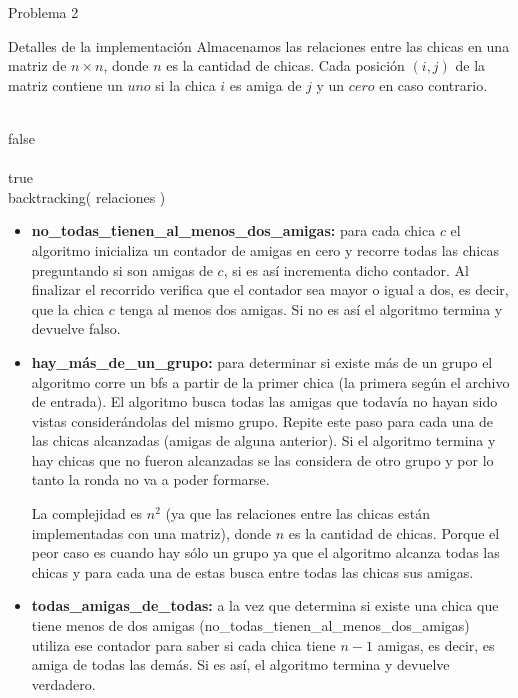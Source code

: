 \begin{section}{Problema 2}
\begin{subsection}{Detalles de la implementación}
		Almacenamos las relaciones entre las chicas en una matriz de $n \times n$, donde $n$ es la cantidad de chicas. Cada posición $(i,j)$ de la matriz contiene un $uno$ si la chica $i$ es amiga de $j$ y un $cero$ en caso contrario.\VSP

		\begin{pseudo}
			\tab{} \\
			\tab\tab \RET false \\
			\tab{} \\
			\tab\tab \RET true \\
			\tab backtracking( relaciones )
		\end{pseudo}

		\begin{itemize}
			\item \textbf{no\_todas\_tienen\_al\_menos\_dos\_amigas:} para cada chica $c$ el algoritmo inicializa un contador de amigas en cero y recorre todas las chicas preguntando si son amigas de $c$, si es así incrementa dicho contador. Al finalizar el recorrido verifica que el contador sea mayor o igual a dos, es decir, que la chica $c$ tenga al menos dos amigas. Si no es así el algoritmo termina y devuelve falso.

			\item \textbf{hay\_más\_de\_un\_grupo:} para determinar si existe más de un grupo el algoritmo corre un bfs a partir de la primer chica (la primera según el archivo de entrada). El algoritmo busca todas las amigas que todavía no hayan sido vistas considerándolas del mismo grupo. Repite este paso para cada una de las chicas alcanzadas (amigas de alguna anterior). Si el algoritmo termina y hay chicas que no fueron alcanzadas se las considera de otro grupo y por lo tanto la ronda no va a poder formarse.

La complejidad es $n^2$ (ya que las relaciones entre las chicas están implementadas con una matriz), donde $n$ es la cantidad de chicas. Porque el peor caso es cuando hay sólo un grupo ya que el algoritmo alcanza todas las chicas y para cada una de estas busca entre todas las chicas sus amigas.

		\item \textbf{todas\_amigas\_de\_todas:} a la vez que determina si existe una chica que tiene menos de dos amigas (no\_todas\_tienen\_al\_menos\_dos\_amigas) utiliza ese contador para saber si cada chica tiene $n-1$ amigas, es decir, es amiga de todas las demás. Si es así, el algoritmo termina y devuelve verdadero.


\end{itemize}
\end{subsection}
\end{section}
